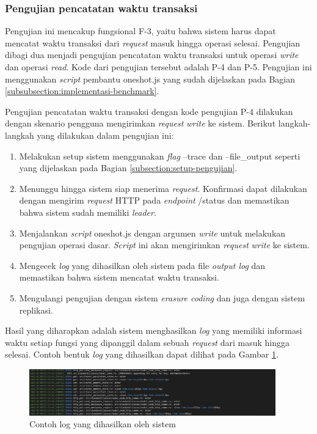 \subsubsection{Pengujian pencatatan waktu transaksi}
\label{subsubsection:pengujian-pencatatan-waktu-transaksi}

Pengujian ini mencakup fungsional F-3, yaitu bahwa sistem harus dapat mencatat waktu transaksi dari \textit{request} masuk hingga operasi selesai. Pengujian dibagi dua menjadi pengujian pencatatan waktu transaksi untuk operasi \textit{write} dan operasi \textit{read}. Kode dari pengujian tersebut adalah P-4 dan P-5. Pengujian ini menggunakan \textit{script} pembantu oneshot.js yang sudah dijelaskan pada Bagian \ref{subsubsection:implementasi-benchmark}.

Pengujian pencatatan waktu transaksi dengan kode pengujian P-4 dilakukan dengan skenario pengguna mengirimkan \textit{request} \textit{write} ke sistem. Berikut langkah-langkah yang dilakukan dalam pengujian ini:

\begin{enumerate}
  \item Melakukan setup sistem menggunakan \textit{flag} --trace dan --file\_output seperti yang dijelaskan pada Bagian \ref{subsection:setup-pengujian}.
  \item Menunggu hingga sistem siap menerima \textit{request}. Konfirmasi dapat dilakukan dengan mengirim \textit{request} HTTP pada \textit{endpoint} /status dan memastikan bahwa sistem sudah memiliki \textit{leader}.
  \item Menjalankan \textit{script} oneshot.js dengan argumen \textit{write} untuk melakukan pengujian operasi dasar. \textit{Script} ini akan mengirimkan \textit{request} \textit{write} ke sistem.
  \item Mengecek \textit{log} yang dihasilkan oleh sistem pada file \textit{output log} dan memastikan bahwa sistem mencatat waktu transaksi.
  \item Mengulangi pengujian dengan sistem \textit{erasure coding} dan juga dengan sistem replikasi.
\end{enumerate}

Hasil yang diharapkan adalah sistem menghasilkan \textit{log} yang memiliki informasi waktu setiap fungsi yang dipanggil dalam sebuah \textit{request} dari masuk hingga selesai. Contoh bentuk \textit{log} yang dihasilkan dapat dilihat pada Gambar \ref{fig:log-trace}.

\begin{figure}[ht]
    \centering
    \includegraphics[width=0.95\textwidth]{resources/chapter-4/log-trace.png}
    \caption{Contoh log yang dihasilkan oleh sistem}
    \label{fig:log-trace}
\end{figure}

